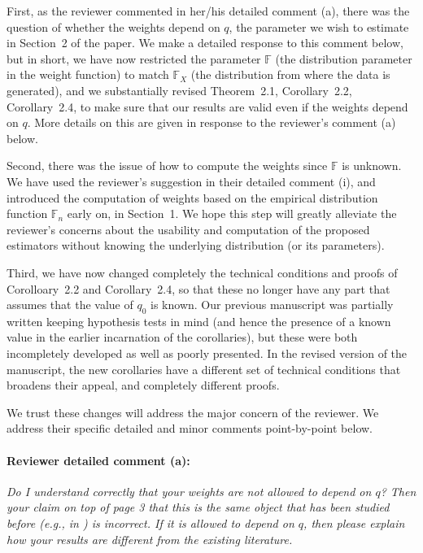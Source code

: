 \documentclass[11pt,letterpaper]{article}
\newcommand{\BF}{{\mathbb{F}}}
\theoremstyle{definition} \newtheorem{Definition}[Theorem]{Definition}
\begin{document}
First, as the reviewer commented in her/his detailed comment (a), there was the question of whether the weights depend on $q$, the parameter we wish to estimate 
in Section~2 of the paper. We make a detailed response to this comment below, but in short, we have now restricted the parameter $\BF$ (the distribution parameter in the weight function) to match $\BF_{X}$ (the distribution from where the data is generated), 
and we substantially revised Theorem~2.1, Corollary~2.2, Corollary~2.4, to make sure that our results are valid even if the weights depend on $q$. More details on this are given in response to the reviewer's comment (a) below. 

Second, there was the issue of how to compute the weights since $\BF$ is unknown. We have used the reviewer's suggestion in their detailed comment (i), and introduced the computation of weights based on the empirical distribution function $\BF_{n}$ early on, in 
Section~1. We hope this step will greatly alleviate the reviewer's concerns about the usability and computation of the proposed estimators without knowing the underlying distribution (or its parameters). 

Third, we have now changed completely the technical conditions and proofs of Corolloary~2.2 and Corollary~2.4, so that these no longer have any part that assumes that the value of $q_{0}$ is known. Our previous manuscript was partially written keeping hypothesis tests in mind (and hence the presence of a known value in the earlier incarnation of the corollaries), but these were both incompletely developed as well as poorly presented. In the revised version of the manuscript, the new corollaries have a different set of technical conditions that broadens their appeal, and completely different proofs. 

We trust these changes will address the major concern of the reviewer. We address their specific detailed and minor comments point-by-point below.




\paragraph{Reviewer detailed comment (a):}
\textit{Do I understand correctly that your weights are not allowed to depend on $q$? Then your claim on top of page 3 that this is the same object that has been studied before (e.g., in \cite{ref:AoS97435_Koltchinskii}) is incorrect. If it is allowed to depend on $q$, then please explain how your results are different from the existing literature.}
\end{document}
